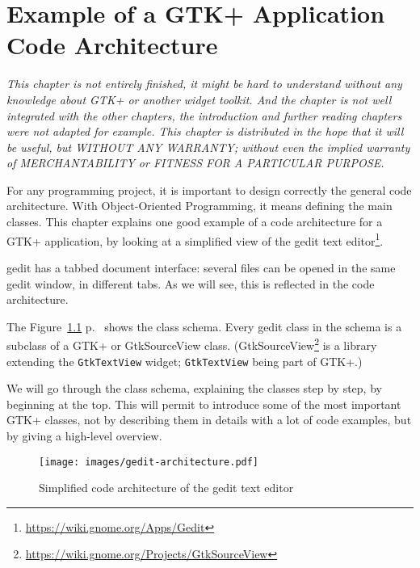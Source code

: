 \chapter{Example of a GTK+ Application Code Architecture}
\label{gtk-app-arch}

\emph{This chapter is not entirely finished, it might be hard to understand without any knowledge about GTK+ or another widget toolkit. And the chapter is not well integrated with the other chapters, the introduction and further reading chapters were not adapted for example. This chapter is distributed in the hope that it will be useful, but WITHOUT ANY WARRANTY; without even the implied warranty of MERCHANTABILITY or FITNESS FOR A PARTICULAR PURPOSE.}


For any programming project, it is important to design correctly the general code architecture. With Object-Oriented Programming, it means defining the main classes. This chapter explains one good example of a code architecture for a GTK+ application, by looking at a simplified view of the gedit text editor\footnote{\url{https://wiki.gnome.org/Apps/Gedit}}.

gedit has a tabbed document interface: several files can be opened in the same gedit window, in different tabs. As we will see, this is reflected in the code architecture.

The Figure~\ref{fig:gedit-architecture} p.~\pageref{fig:gedit-architecture} shows the class schema. Every gedit class in the schema is a subclass of a GTK+ or GtkSourceView class. (GtkSourceView\footnote{\url{https://wiki.gnome.org/Projects/GtkSourceView}} is a library extending the \lstinline{GtkTextView} widget; \lstinline{GtkTextView} being part of GTK+.)

We will go through the class schema, explaining the classes step by step, by beginning at the top. This will permit to introduce some of the most important GTK+ classes, not by describing them in details with a lot of code examples, but by giving a high-level overview.

\begin{figure}
  \begin{center}
    \texttt{[image: images/gedit-architecture.pdf]}
    \caption{Simplified code architecture of the gedit text editor}
    \label{fig:gedit-architecture}
  \end{center}
\end{figure}

